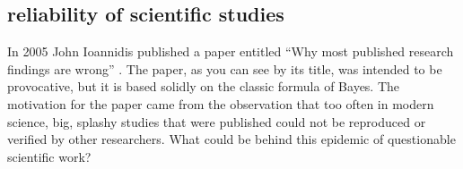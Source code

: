 \documentclass[
  letterpaper,
  DIV=11,
  numbers=noendperiod]{scrreprt}
\begin{document}
\hypertarget{reliability-of-scientific-studies}{%
\subsection{reliability of scientific
studies}\label{reliability-of-scientific-studies}}

In 2005 John Ioannidis published a paper entitled ``Why most published
research findings are wrong'' \cite{ioannidis_why_2005}. The paper, as
you can see by its title, was intended to be provocative, but it is
based solidly on the classic formula of Bayes. The motivation for the
paper came from the observation that too often in modern science, big,
splashy studies that were published could not be reproduced or verified
by other researchers. What could be behind this epidemic of questionable
scientific work?
\end{document}
